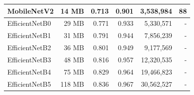 \begin{table}[h!]
\begin{tabular}{|l|r|r|r|r|r|}
    MobileNetV2                                                  & 14 MB                              & 0.713                                                                                   & 0.901                                                                                   & 3,538,984                                & 88                                  \\ \hline
    EfficientNetB0                                               & 29 MB                              & 0.771                                                                                   & 0.933                                                                                   & 5,330,571                                & -                                   \\ \hline
    EfficientNetB1                                               & 31 MB                              & 0.791                                                                                   & 0.944                                                                                   & 7,856,239                                & -                                   \\ \hline
    EfficientNetB2                                               & 36 MB                              & 0.801                                                                                   & 0.949                                                                                   & 9,177,569                                & -                                   \\ \hline
    EfficientNetB3                                               & 48 MB                              & 0.816                                                                                   & 0.957                                                                                   & 12,320,535                               & -                                   \\ \hline
    EfficientNetB4                                               & 75 MB                              & 0.829                                                                                   & 0.964                                                                                   & 19,466,823                               & -                                   \\ \hline
    EfficientNetB5                                               & 118 MB                             & 0.836                                                                                   & 0.967                                                                                   & 30,562,527                               & -                                   \\ \hline

\end{tabular}
\end{table}
